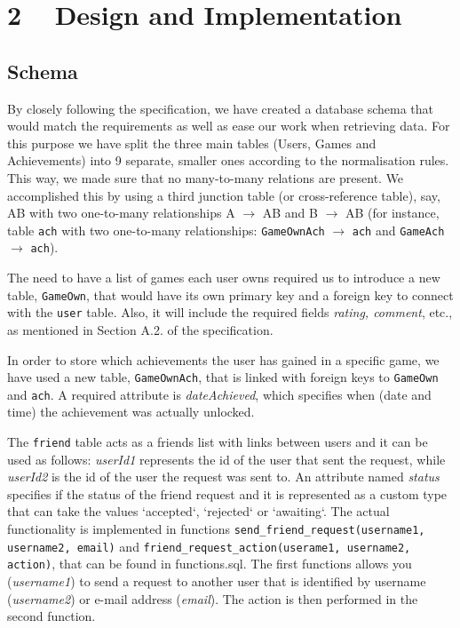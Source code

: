 \documentclass{article}
\begin{document}

\section{2 ~  Design and Implementation}
\subsection{Schema}
\par{By closely following the specification, we have created a database schema that would match the requirements as well as ease our work when retrieving data. For this purpose we have split the three main tables (Users, Games and Achievements) into 9 separate, smaller ones according to the normalisation rules. This way, we made sure that no many-to-many relations are present. We accomplished this by using a third junction table (or cross-reference table), say, AB with two one-to-many relationships A $\rightarrow$ AB and B $\rightarrow$ AB (for instance, table \texttt{ach} with two one-to-many relationships: \texttt{GameOwnAch} $\rightarrow$ \texttt{ach} and \texttt{GameAch} $\rightarrow$ \texttt{ach}).}\\

\par{The need to have a list of games each user owns required us to introduce a new table, \texttt{GameOwn}, that would have its own primary key and a foreign key to connect with the \texttt{user} table. Also, it will include the required fields \emph{rating, comment}, etc., as mentioned in Section A.2. of the specification.}\\

\par {In order to store which achievements the user has gained in a specific game, we have used a new table, \texttt{GameOwnAch}, that is linked with foreign keys to \texttt{GameOwn} and \texttt{ach}. A required attribute is \emph{dateAchieved}, which specifies when (date and time) the achievement was actually unlocked.}\\

\par {The \texttt{friend} table acts as a friends list with links between users and it can be used as follows: \emph{userId1} represents the id of the user that sent the request, while \emph{userId2} is the id of the user the request was sent to. An attribute named \emph{status} specifies if the status of the friend request and it is represented as a custom type that can take the values `accepted`, `rejected` or `awaiting`. The actual functionality is implemented in functions \texttt{send\_friend\_request(username1, username2, email)} and \texttt{friend\_request\_action(userame1, username2, action)}, that can be found in functions.sql. The first functions allows you (\emph{username1}) to send a request to another user that is identified by username (\emph{username2}) or e-mail address (\emph{email}). The action is then performed in the second function.}\\
\end{document}
